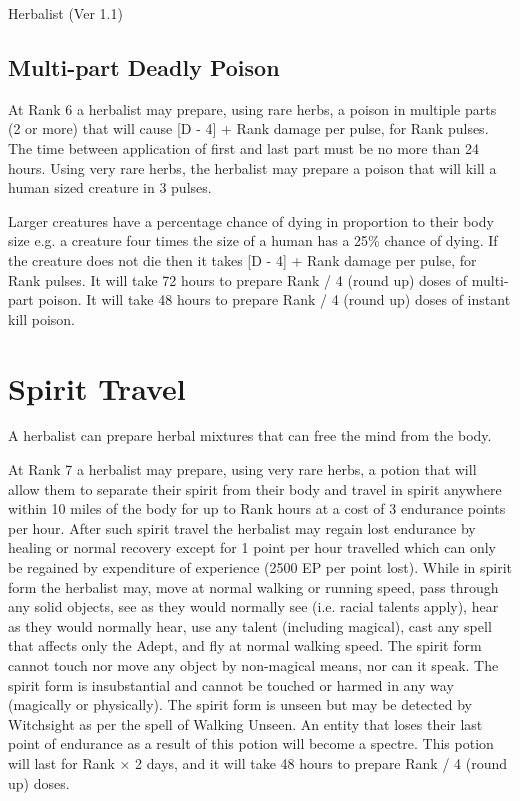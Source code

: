 \begin{Chapter}{Herbalist (Ver 1.1)}
\subsection{Multi-part Deadly Poison}

At Rank 6 a herbalist may prepare, using rare herbs, a poison in
multiple parts (2 or more) that will cause [D - 4] + Rank damage per
pulse, for Rank pulses. The time between application of first and last
part must be no more than 24 hours. Using very rare herbs, the
herbalist may prepare a poison that will kill a human sized creature
in 3 pulses.

Larger creatures have a percentage chance of dying in proportion to
their body size e.g. a creature four times the size of a human has a
25\% chance of dying. If the creature does not die then it takes [D -
  4] + Rank damage per pulse, for Rank pulses.  It will take 72 hours
to prepare Rank / 4 (round up) doses of multi-part poison. It will
take 48 hours to prepare Rank / 4 (round up) doses of instant kill
poison.

\section{Spirit Travel}

A herbalist can prepare herbal mixtures that can free the mind from
the body.

At Rank 7 a herbalist may prepare, using very rare herbs, a potion
that will allow them to separate their spirit from their body and
travel in spirit anywhere within 10 miles of the body for up to Rank
hours at a cost of 3 endurance points per hour.  After such spirit
travel the herbalist may regain lost endurance by healing or normal
recovery except for 1 point per hour travelled which can only be
regained by expenditure of experience (2500 EP per point lost).  While
in spirit form the herbalist may, move at normal walking or running
speed, pass through any solid objects, see as they would normally see
(i.e.  racial talents apply), hear as they would normally hear, use
any talent (including magical), cast any spell that affects only the
Adept, and fly at normal walking speed.  The spirit form cannot touch
nor move any object by non-magical means, nor can it speak.  The
spirit form is insubstantial and cannot be touched or harmed in any
way (magically or physically).  The spirit form is unseen but may be
detected by Witchsight as per the spell of Walking Unseen. An entity
that loses their last point of endurance as a result of this potion
will become a spectre.  This potion will last for Rank × 2 days, and
it will take 48 hours to prepare Rank / 4 (round up) doses.

\end{Chapter}
